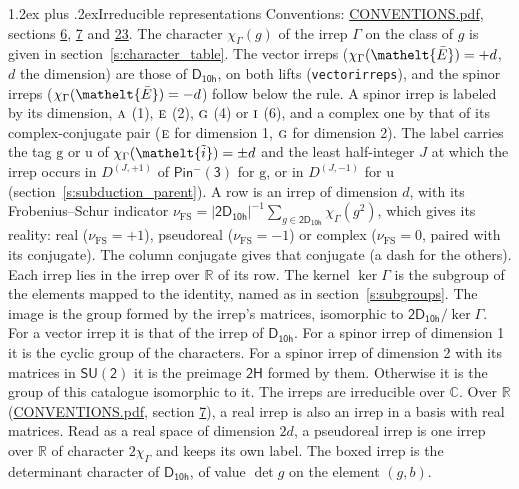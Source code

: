 \documentclass[10pt,a4paper]{article}
\makeatletter
\renewcommand\section{\@startsection{section}{1}{\z@}{-3ex plus -1ex minus -.2ex}%
  {1.2ex plus .2ex}{\normalfont\large\sffamily\bfseries\color{parttitle}}}
\numberwithin{equation}{section}
\newcommand{\eltfont}[1]{{\let\sigma\eltsigma\mathelt{#1}}}
\newcommand{\grp}[1]{\mathsf{#1}}
\newcommand{\irr}[1]{\text{\normalfont\scshape #1}}
\newcommand{\elt}[1]{\eltfont{#1}}
\newcommand{\ptag}[1]{\mathrm{#1}}
\newcommand{\irrJp}[2]{D^{(#1,#2)}}
\newcommand{\irchar}[1]{\chi_{#1}}
\newcommand{\fsind}{\nu_{\mathrm{FS}}}
\newcommand{\barred}[1]{\bar{#1}}
\newcommand{\lift}[1]{\tilde{#1}}
\makeatother
\begin{document}
\section{Irreducible representations}\label{s:irreps}
Conventions: \href{../../CONVENTIONS.pdf}{CONVENTIONS.pdf}, sections \href{../../../rotation/CONVENTIONS.pdf\#conv.6}{6}, \href{../../../rotation/CONVENTIONS.pdf\#conv.7}{7} and \href{../../CONVENTIONS.pdf\#conv.23}{23}.
\leavevmode\label{n:function.character}\label{n:irrep.Gamma}The character $\irchar{\Gamma}(g)$ of the irrep $\Gamma$ on the class of $g$ is given in section~\ref{s:character_table}. \label{n:index.dimension}The vector irreps ($\irchar{\Gamma}(\elt{\barred{E}}) = +d$, $d$ the dimension) are those of \href{../../../rotation/data/pdf/D10h.pdf}{$\grp{D_{10h}}$}, on both lifts (\texttt{vectorirreps}), and the spinor irreps ($\irchar{\Gamma}(\elt{\barred{E}}) = -d$) follow below the rule. A spinor irrep is labeled by its dimension, $\irr{a}$ (1), $\irr{e}$ (2), $\irr{g}$ (4) or $\irr{i}$ (6), and a complex one by that of its complex-conjugate pair ($\irr{e}$ for dimension 1, $\irr{g}$ for dimension 2). The label carries the tag $\ptag{g}$ or $\ptag{u}$ of $\irchar{\Gamma}(\elt{\lift{i}}) = \pm d$ and the least half-integer $J$ at which the irrep occurs in $\irrJp{J}{+1}$ of $\grp{Pin^{-}(3)}$ for $\ptag{g}$, or in $\irrJp{J}{-1}$ for $\ptag{u}$ (section~\ref{s:subduction_parent}).
\leavevmode\label{n:index.frobenius}\label{n:head.irrep}\label{n:head.reality}A row is an irrep of dimension $d$, with its Frobenius--Schur indicator $\fsind = |\grp{2D_{10h}}|^{-1}\allowbreak\sum_{g\in\grp{2D_{10h}}}\irchar{\Gamma}(g^2)$, which gives its reality: real ($\fsind = +1$), pseudoreal ($\fsind = -1$) or complex ($\fsind = 0$, paired with its conjugate). \label{n:head.conjugate}The column conjugate gives that conjugate (a dash for the others). \label{n:head.over.real}Each irrep lies in the irrep over $\mathbb{R}$ of its row. \label{n:head.kernel}The kernel $\ker\Gamma$ is the subgroup of the elements mapped to the identity, named as in section~\ref{s:subgroups}. \label{n:head.image}The image is the group formed by the irrep's matrices, isomorphic to $\grp{2D_{10h}}/\ker\Gamma$. For a vector irrep it is that of the irrep of \href{../../../rotation/data/pdf/D10h.pdf}{$\grp{D_{10h}}$}. For a spinor irrep of dimension 1 it is the cyclic group of the characters. For a spinor irrep of dimension 2 with its matrices in $\grp{SU(2)}$ it is the preimage $\grp{2H}$ formed by them. Otherwise it is the group of this catalogue isomorphic to it. The irreps are irreducible over $\mathbb{C}$. Over $\mathbb{R}$ (\href{../../CONVENTIONS.pdf}{CONVENTIONS.pdf}, section \href{../../../rotation/CONVENTIONS.pdf\#conv.7}{7}), a real irrep is also an irrep in a basis with real matrices. Read as a real space of dimension $2d$, a pseudoreal irrep is one irrep over $\mathbb{R}$ of character $2\irchar{\Gamma}$ and keeps its own label. \label{n:mark.determinant}The boxed irrep is the determinant character of \href{../../../rotation/data/pdf/D10h.pdf}{$\grp{D_{10h}}$}, of value $\det g$ on the element $(g, b)$.
\end{document}
